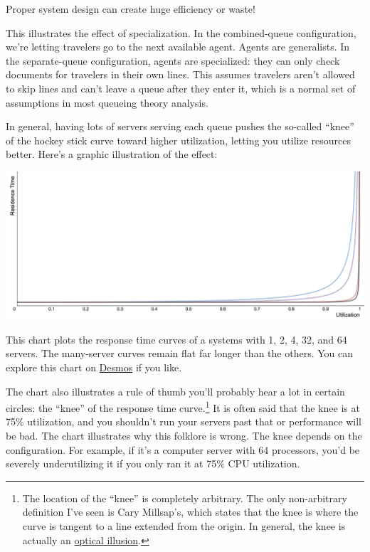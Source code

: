 \documentclass{vivid_layout}
\begin{document}
Proper system design can create huge efficiency or waste!

This illustrates the effect of specialization. In the combined-queue configuration, we're letting travelers go to the next available agent. Agents are generalists. In the separate-queue configuration, agents are specialized: they can only check documents for travelers in their own lines. This assumes travelers aren't allowed to skip lines and can't leave a queue after they enter it, which is a normal set of assumptions in most queueing theory analysis.

In general, having lots of servers serving each queue pushes the so-called ``knee'' of the hockey stick curve toward higher utilization, letting you utilize resources better. Here's a graphic illustration of the effect:

\begin{center}
\includegraphics[width=.75\linewidth]{queueing-theory/multi-q}
\end{center}

This chart plots the response time curves of a systems with 1, 2, 4, 32, and 64 servers. The many-server curves remain flat far longer than the others. You can explore this chart on \href{https://www.desmos.com/calculator/iwaj9vujiu}{Desmos} if you like.

The chart also illustrates a rule of thumb you'll probably hear a lot in certain circles: the ``knee'' of the response time curve.\footnote{The location of the ``knee'' is completely arbitrary. The only non-arbitrary definition I've seen is Cary Millsap's, which states that the knee is where the curve is tangent to a line extended from the origin. In general, the knee is actually an \href{http://perfdynamics.blogspot.com/2008/03/watching-your-knees-and-queues.html}{optical illusion}.} It is often said that the knee is at 75\% utilization, and you shouldn't run your servers past that or performance will be bad. The chart illustrates why this folklore is wrong. The knee depends on the configuration. For example, if it's a computer server with 64 processors, you'd be severely underutilizing it if you only ran it at 75\% CPU utilization.
\end{document}
